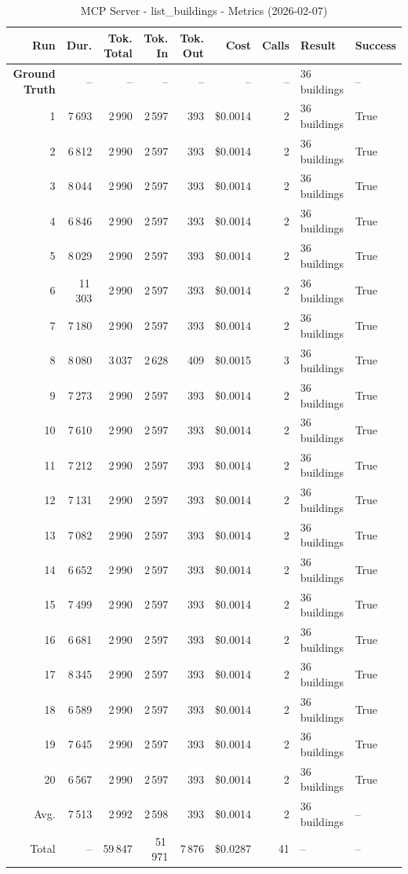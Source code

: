 \documentclass[a4paper,11pt]{article}
\begin{document}
\begin{table}[ht]
\centering
\scriptsize
\caption{MCP Server - list\_buildings - Metrics (2026-02-07)}
\label{tab:mcp\_list\_buildings\_metrics\_2026-02-07}
\begin{tabular}{r r r r r r r p{3cm} l}
\hline
Run & Dur. & Tok. Total & Tok. In & Tok. Out & Cost & Calls & Result & Success \\
\hline
\textbf{Ground Truth} & -- & -- & -- & -- & -- & -- & 36 buildings & -- \\
1 & 7\,693 & 2\,990 & 2\,597 & 393 & \$0.0014 & 2 & 36 buildings & True \\
2 & 6\,812 & 2\,990 & 2\,597 & 393 & \$0.0014 & 2 & 36 buildings & True \\
3 & 8\,044 & 2\,990 & 2\,597 & 393 & \$0.0014 & 2 & 36 buildings & True \\
4 & 6\,846 & 2\,990 & 2\,597 & 393 & \$0.0014 & 2 & 36 buildings & True \\
5 & 8\,029 & 2\,990 & 2\,597 & 393 & \$0.0014 & 2 & 36 buildings & True \\
6 & 11\,303 & 2\,990 & 2\,597 & 393 & \$0.0014 & 2 & 36 buildings & True \\
7 & 7\,180 & 2\,990 & 2\,597 & 393 & \$0.0014 & 2 & 36 buildings & True \\
8 & 8\,080 & 3\,037 & 2\,628 & 409 & \$0.0015 & 3 & 36 buildings & True \\
9 & 7\,273 & 2\,990 & 2\,597 & 393 & \$0.0014 & 2 & 36 buildings & True \\
10 & 7\,610 & 2\,990 & 2\,597 & 393 & \$0.0014 & 2 & 36 buildings & True \\
11 & 7\,212 & 2\,990 & 2\,597 & 393 & \$0.0014 & 2 & 36 buildings & True \\
12 & 7\,131 & 2\,990 & 2\,597 & 393 & \$0.0014 & 2 & 36 buildings & True \\
13 & 7\,082 & 2\,990 & 2\,597 & 393 & \$0.0014 & 2 & 36 buildings & True \\
14 & 6\,652 & 2\,990 & 2\,597 & 393 & \$0.0014 & 2 & 36 buildings & True \\
15 & 7\,499 & 2\,990 & 2\,597 & 393 & \$0.0014 & 2 & 36 buildings & True \\
16 & 6\,681 & 2\,990 & 2\,597 & 393 & \$0.0014 & 2 & 36 buildings & True \\
17 & 8\,345 & 2\,990 & 2\,597 & 393 & \$0.0014 & 2 & 36 buildings & True \\
18 & 6\,589 & 2\,990 & 2\,597 & 393 & \$0.0014 & 2 & 36 buildings & True \\
19 & 7\,645 & 2\,990 & 2\,597 & 393 & \$0.0014 & 2 & 36 buildings & True \\
20 & 6\,567 & 2\,990 & 2\,597 & 393 & \$0.0014 & 2 & 36 buildings & True \\
\hline
Avg. & 7\,513 & 2\,992 & 2\,598 & 393 & \$0.0014 & 2 & 36 buildings & -- \\
Total & -- & 59\,847 & 51\,971 & 7\,876 & \$0.0287 & 41 & -- & -- \\
\hline
\end{tabular}
\end{table}
\end{document}

